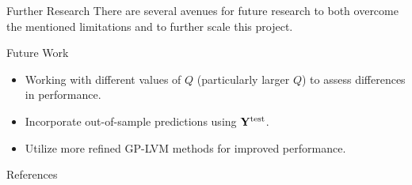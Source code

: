 \documentclass[dvipsnames]{beamer}
\newcommand{\test}{\textrm{test}}
\begin{document}
\begin{frame}{Further Research}
    There are several avenues for future research to both overcome the mentioned limitations and to further scale this project. 

    \bigskip

    \begin{exampleblock}{Future Work}
        \begin{itemize}[label=]
            \item Working with different values of $Q$ (particularly larger $Q$) to assess differences in performance.
            \item Incorporate out-of-sample predictions using $\bfY^{\test}$.
            \item Utilize more refined GP-LVM methods for improved performance.
        \end{itemize}
    \end{exampleblock}
\end{frame}

\appendix

\begin{frame}[allowframebreaks]{References}
    
    \nocite{Fashion-MNIST,pytorch-library,numpy-library,scikit-learn-library,Rasmussen-GPML-2006}
    \footnotesize 
    
\end{frame}
\end{document}
